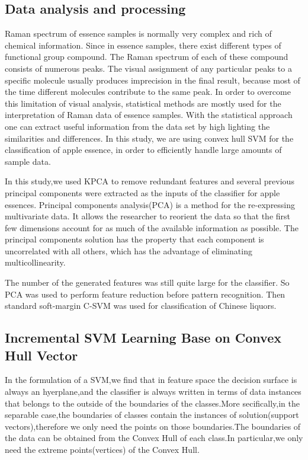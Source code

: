 \documentclass[a4paper]{article}
\begin{document}
\subsection{Data analysis and processing}%
Raman  spectrum  of  essence samples  is  normally  very  complex  and  rich  of  chemical information.  Since  in essence  samples,  there  exist  different  types  of  functional group compound. The Raman spectrum of each of these compound consists of  numerous peaks.  The  visual  assignment  of  any  particular  peaks  to  a  specific  molecule usually  produces  imprecision  in  the  final  result,  because  most  of  the  time  different molecules  contribute  to  the  same  peak.  In  order  to  overcome  this  limitation  of  visual analysis, statistical methods are mostly used for the interpretation of Raman data of essence samples. With the statistical approach one can extract useful information from the data set by high  lighting  the  similarities  and differences.  In  this  study,  we  are using convex hull SVM  for  the  classification of  apple essence,  in order to efficiently handle large amounts of sample data.

In this study,we used KPCA to remove redundant features and several previous principal components were extracted as the inputs of the classifier for apple essences.
Principal components analysis(PCA)  is  a  method  for  the  re-expressing  multivariate  data.   It  allows  the researcher to reorient the data so that the first few dimensions account for as much  of  the  available  information  as  possible.  The  principal  components solution has the property that each component is uncorrelated with all others, which  has  the  advantage  of  eliminating  multicollinearity.

The number of the generated features was still quite large for  the  classifier.  So  PCA  was  used  to  perform  feature reduction  before  pattern  recognition.  Then  standard soft-margin  C-SVM  was  used  for  classification  of  Chinese liquors.

\subsection{Incremental SVM Learning Base on Convex Hull Vector}
In the formulation of a SVM,we find that in feature space the decision surface is always an hyerplane,and the classifier is always written in terms of data instances that belongs to the outside of the boundaries of the classes.More secifically,in the separable case,the boundaries of classes contain the instances of solution(support vectors),therefore we only need the points on those boundaries.The boundaries of the data can be obtained from the Convex Hull of each class.In particular,we only need the extreme points(vertices) of the Convex Hull.
\end{document}
